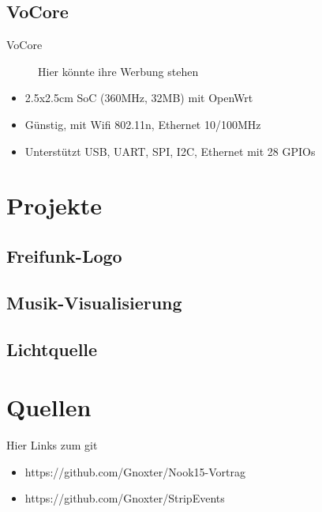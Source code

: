 \documentclass{beamer}
\begin{document}
\subsection{VoCore}
\begin{frame}{VoCore}
\begin{figure}[h]
 \centering
 Hier könnte ihre Werbung stehen
\end{figure}
\begin{itemize}
 \item 2.5x2.5cm SoC (360MHz, 32MB) mit OpenWrt
 \item Günstig, mit Wifi 802.11n, Ethernet 10/100MHz
 \item Unterstützt USB, UART, SPI, I2C, Ethernet mit 28 GPIOs
\end{itemize}
\end{frame}

\section{Projekte}
\subsection{Freifunk-Logo}
\begin{frame}
\end{frame}

\subsection{Musik-Visualisierung}
\begin{frame}
\end{frame}

\subsection{Lichtquelle}
\begin{frame}
\end{frame}

\section{Quellen}
\begin{frame}
 Hier Links zum git
\begin{itemize}
 \item https://github.com/Gnoxter/Nook15-Vortrag
 \item https://github.com/Gnoxter/StripEvents
\end{itemize}
\end{frame}
\end{document}
